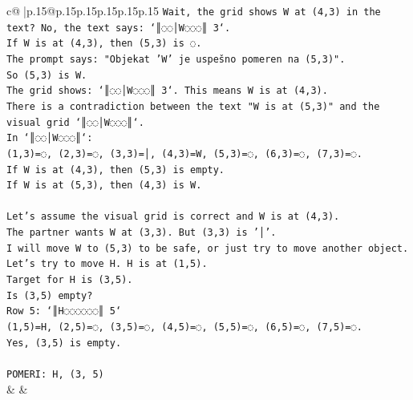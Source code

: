\documentclass{article}
\begin{document}
{\begin{supertabular}{c@{$\;$}|p{.15\linewidth}@{}p{.15\linewidth}p{.15\linewidth}p{.15\linewidth}p{.15\linewidth}p{.15\linewidth}}
{{{\texttt{Wait, the grid shows W at (4,3) in the text? No, the text says: `║◌◌│W◌◌◌║ 3`.} \\
\texttt{If W is at (4,3), then (5,3) is ◌.} \\
\texttt{The prompt says: "Objekat 'W' je uspešno pomeren na (5,3)".} \\
\texttt{So (5,3) is W.} \\
\texttt{The grid shows: `║◌◌│W◌◌◌║ 3`. This means W is at (4,3).} \\
\texttt{There is a contradiction between the text "W is at (5,3)" and the visual grid `║◌◌│W◌◌◌║`.} \\
\texttt{In `║◌◌│W◌◌◌║`:} \\
\texttt{(1,3)=◌, (2,3)=◌, (3,3)=│, (4,3)=W, (5,3)=◌, (6,3)=◌, (7,3)=◌.} \\
\texttt{If W is at (4,3), then (5,3) is empty.} \\
\texttt{If W is at (5,3), then (4,3) is W.} \\
\\ 
\texttt{Let's assume the visual grid is correct and W is at (4,3).} \\
\texttt{The partner wants W at (3,3). But (3,3) is '│'.} \\
\texttt{I will move W to (5,3) to be safe, or just try to move another object.} \\
\texttt{Let's try to move H. H is at (1,5).} \\
\texttt{Target for H is (3,5).} \\
\texttt{Is (3,5) empty?} \\
\texttt{Row 5: `║H◌◌◌◌◌◌║ 5`} \\
\texttt{(1,5)=H, (2,5)=◌, (3,5)=◌, (4,5)=◌, (5,5)=◌, (6,5)=◌, (7,5)=◌.} \\
\texttt{Yes, (3,5) is empty.} \\
\\ 
\texttt{POMERI: H, (3, 5)} \\
            }
        }
    }
    & & \\ \\


\end{supertabular}}
\end{document}
